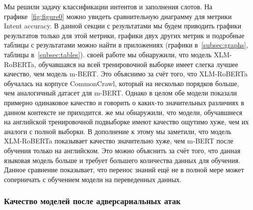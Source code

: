 Мы решили задачу классификации интентов и заполнения слотов.
На графике~\eqref{fig:figure0} можно увидеть сравнительную диаграмму для метрики Intent accuracy.
В данной секции с результатами мы будем приводить графики результатов только для этой метрики, графики двух других метрик и подробные таблицы с результатами можно найти в приложениях (графики в~\eqref{subsec:graphs}, таблицы в~\eqref{subsec:tables}).
 своей работе мы обнаружили, что модель XLM-RoBERTa, обучавшаяся на всей тренировочной выборке имеет слегка лучшее качество, чем модель m-BERT\@.
Это объяснимо за счёт того, что XLM-RoBERTa обучалась на корпусе CommonCrawl, который на несколько порядков больше, чем аналогичный датасет для m-BERT\@.
Однако в целом обе модели показали примерно одинаковое качество и говорить о каких-то значительных различиях в данном контексте не приходится.
 же мы обнаружили, что модели, обучавшиеся на английской тренировочной подвыборке имеют качество ощутимо хуже, чем их аналоги с полной выборки.
В дополнение к этому мы заметили, что модель XLM-RoBERTa показывает качество значительно хуже, чем m-BERT после обучения только на английском.
Это можно объяснить за счёт того, что данная языковая модель больше и требует большего количества данных для обучения.
Данное сравнение показывает, что перенос знаний ещё не в полной мере может соперничать с обучением модели на переведенных данных.

\subsubsection{Качество моделей после адверсариальных атак}


